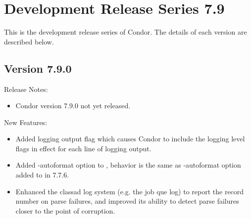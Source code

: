 
\section{\label{sec:History-7-9}Development Release Series 7.9}

This is the development release series of Condor.
The details of each version are described below.

\subsection*{\label{sec:New-7-9-0}Version 7.9.0}

\noindent Release Notes:

\begin{itemize}

\item Condor version 7.9.0 not yet released.

\end{itemize}


\noindent New Features:

\begin{itemize}

\item Added logging output flag  which causes Condor to include the logging level
flags in effect for each line of logging output.

\item Added -autoformat option to , behavior is the same as -autoformat option
added to  in 7.7.6.

\item Enhanced the classad log system (e.g. the job que log) to report the record number on parse failures, 
and improved its ability to detect parse failures closer to the point of corruption.

\end{itemize}

